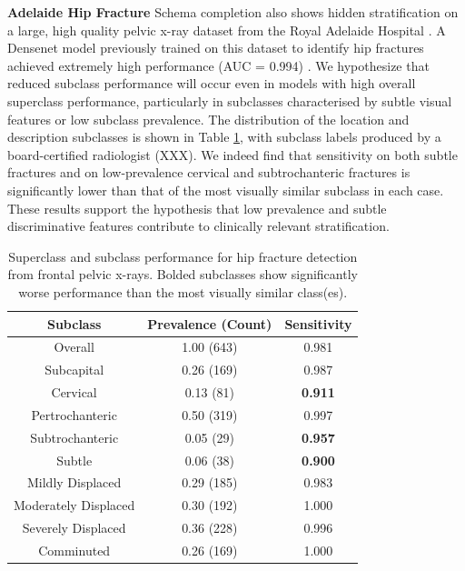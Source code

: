 \documentclass{article}
\begin{document}
\textbf{Adelaide Hip Fracture} Schema completion also shows hidden stratification on a large, high quality pelvic x-ray dataset from the Royal Adelaide Hospital \citep{Gale_W_Oakden-Rayner_L_Carneiro_G_Bradley_AP_Palmer_LJ2017-tl}.
 A Densenet model previously trained on this dataset to identify hip fractures achieved extremely high performance (AUC = 0.994) \citep{Gale_W_Oakden-Rayner_L_Carneiro_G_Bradley_AP_Palmer_LJ2017-tl}. 
  We hypothesize that reduced subclass performance will occur even in models with high overall superclass performance, particularly in subclasses characterised by subtle visual features or low subclass prevalence.  
 The distribution of the location and description subclasses is shown in Table \ref{tab:hip1}, with subclass labels produced by a board-certified radiologist (XXX).  
 We indeed find that sensitivity on both subtle fractures and on low-prevalence cervical and subtrochanteric fractures is significantly lower than that of the most visually similar subclass in each case.
These results support the hypothesis that low prevalence and subtle discriminative features contribute to clinically relevant stratification.  
 
\begin{table}[htb!]
\centering
\begin{tabular}{|c|c|c|}
\hline
 Subclass & Prevalence (Count) & Sensitivity \\
 \hline
 Overall & 1.00 (643) & 0.981  \\
 Subcapital & 0.26 (169) & 0.987   \\
 Cervical & 0.13 (81) & \textbf{0.911}\\
 Pertrochanteric & 0.50 (319)  & 0.997\\
 Subtrochanteric & 0.05 (29) & \textbf{0.957} \\
 Subtle & 0.06 (38) & \textbf{0.900}\\
 Mildly Displaced & 0.29 (185) & 0.983\\
 Moderately Displaced & 0.30 (192) & 1.000\\
 Severely Displaced & 0.36 (228) & 0.996\\
 Comminuted & 0.26 (169) & 1.000 \\ 
 \hline
\end{tabular}
\caption{Superclass and subclass performance for hip fracture detection from frontal pelvic x-rays. Bolded subclasses show significantly worse performance than the most visually similar class(es).}
\label{tab:hip1}
\vspace{-6mm}
\end{table}
\end{document}
